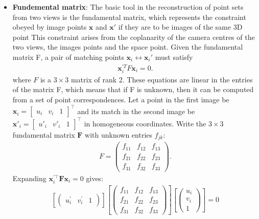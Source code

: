 \documentclass{report}
\begin{document}
\begin{itemize}
        \item \textbf{Fundemental matrix}: The basic tool in the reconstruction of point sets from two views is the fundamental matrix, which represents the constraint obeyed by image points $\mathbf{x}$ and $\mathbf{x}'$ if they are to be images of the same 3D point
            \bigbreak \noindent 
            This constraint arises from the coplanarity of the camera centres of the two views, the images points and the space point. Given the fundamental matrix F, a pair of matching points $\mathbf{x}_{i}\leftrightarrow \mathbf{x}_{i}'$ must satisfy
            \begin{align*}
                \mathbf{x}^{\prime T}_{i}F\mathbf{x}_{i} = 0
            .\end{align*}
            where $F$ is a $3\times 3$ matrix of rank 2. These equations are linear in the entries of the matrix F, which means that if F is unknown, then it can be computed from a set of point correspondences.
            \bigbreak \noindent 
            Let a point in the first image be \(\mathbf{x}_i = \begin{bmatrix} u_i & v_i & 1 \end{bmatrix}^\top\) and its match in the second image be \(\mathbf{x}'_i = \begin{bmatrix} u'_i & v'_i & 1 \end{bmatrix}^\top\) in homogeneous coordinates.
            \bigbreak \noindent 
            Write the \(3 \times 3\) fundamental matrix \(\mathbf{F}\) with unknown entries \(f_{jk}\):
            \begin{align*}
                F = \begin{pmatrix} f_{11} & f_{12} & f_{13} \\ f_{21} & f_{22} & f_{23} \\ f_{31} & f_{32} & f_{33} \end{pmatrix}
            .\end{align*}
            Expanding \(\mathbf{x}_i^{\prime \top} \mathbf{F} \mathbf{x}_i = 0\) gives:
            \begin{align*}
                \left[\begin{pmatrix}u_{i}^{\prime }&v_{i}^{\prime }&1\end{pmatrix}\right]\left[\begin{pmatrix}f_{11}&f_{12}&f_{13}\\ f_{21}&f_{22}&f_{23}\\ f_{31}&f_{32}&f_{33}\end{pmatrix}\right]\left[\begin{pmatrix}u_{i}\\ v_{i}\\ 1\end{pmatrix}\right]=0

\end{align*}
\end{itemize}
\end{document}
